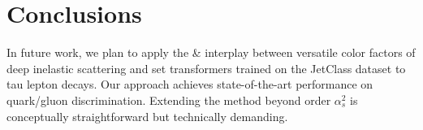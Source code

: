 \section{Conclusions}\label{sec:conclusions}

In future work, we plan to apply the & interplay between versatile color
factors of deep inelastic scattering and set transformers trained on the
JetClass dataset to tau lepton decays. Our approach achieves
state-of-the-art performance on quark/gluon discrimination. Extending
the method beyond order $\alpha_s^2$ is conceptually straightforward but
technically demanding.

